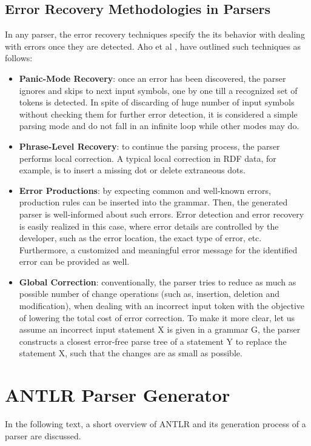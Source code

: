 \subsection{Error Recovery Methodologies in Parsers}
In any parser, the error recovery techniques specify the its behavior with dealing with errors once they are detected.  
Aho et al \cite{Aho:2006}, have outlined such techniques as follows:

\begin{itemize}
	\item \textbf{Panic-Mode Recovery}: once an error has been discovered, the parser ignores and skips to next input symbols, one by one till a recognized set of tokens is detected. 
	In spite of discarding of huge number of input symbols without checking them for further error detection, it is considered a simple parsing mode and do not fall in an infinite loop while other modes may do.
	
	\item \textbf{Phrase-Level Recovery}: to continue the parsing process, the parser performs local correction. A typical local correction in RDF data, for example, is to insert a missing dot or delete extraneous dots.
	
	\item \textbf{Error Productions}: by expecting common and well-known errors, production rules can be inserted into the grammar. 
	Then, the generated parser is well-informed about such errors. 
	Error detection and error recovery is easily realized in this case, where error details are controlled by the developer, such as the error location, the exact type of error, etc. 
	Furthermore, a customized and meaningful error message for the identified error can be provided as well. 
	
	\item \textbf{Global Correction}: conventionally, the parser tries to reduce as much as possible number of change operations (such as, insertion, deletion and modification), when dealing with an incorrect input token with the objective of lowering the total cost of error correction. 
	To make it more clear, let us assume an incorrect input statement X is given in a grammar G, the parser constructs a closest error-free parse tree of a statement Y to replace the statement X, such that the changes are as small as possible. 
\end{itemize}


\section{ANTLR Parser Generator}
In the following text, a short overview of ANTLR and its generation process of a parser are discussed.   
\label{sec:bck_ANTLR}

